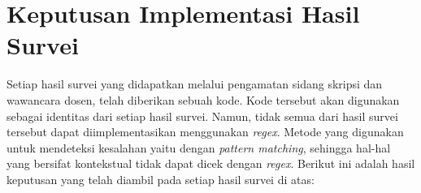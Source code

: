 \begin{comment}
			\item Konsistensi penggunaan kata \\
			Kode implementasi: VAN-02 \\
			Mahasiswa harus konsisten dalam penulisan kata, misalnya kata\textit{user} dan pengguna.  Mahasiswa harus memilih antara memakai \textit{user} atau pengguna.
			
			\item Penggunaan kata ganti orang \\
			Kode implementasi: VAN-03 \\
			Dalam penulisan dokumen skripsi, tidak boleh ada kata ganti orang. Jika karya non-ilmiah lebih santai karena memakai gaya bahasa non-formal, maka berbeda dengan karya ilmiah. Karya ilmiah memiliki aturan baku dan menggunakan bahasa formal. 
			
		\end{itemize}
		
	\item Wawancara ke-5 dilakukan pada tanggal 16 Juli 2019.
	
		\begin{itemize}
			\item Penulisan daftar referensi \\
			Kode implementasi: NAT-01 \\ 
			Penulisan daftar referensi dibuat jika dalam tulisan ilmiah tersebut memang menggunakan kutipan atau rujukan dari orang lain. Kesalahan yang sering terjadi, yaitu tidak ditemukannya referensi yang akan digunakan. Pada teks yang akan dirujuk, akan terdapat tanda [?], seharusnya tanda tanya tersebut diisi oleh nomor dari referensi.
			
		\end{itemize}
		
\end{enumerate}
\end{comment}

\section{Keputusan Implementasi Hasil Survei}

Setiap hasil survei yang didapatkan melalui pengamatan sidang skripsi dan wawancara dosen, telah diberikan sebuah kode. Kode tersebut akan digunakan sebagai identitas dari setiap hasil survei. Namun, tidak semua dari hasil survei tersebut dapat diimplementasikan menggunakan \textit{regex}. Metode yang digunakan untuk mendeteksi kesalahan yaitu dengan \textit{pattern matching}, sehingga hal-hal yang bersifat kontekstual tidak dapat dicek dengan \textit{regex}. Berikut ini adalah hasil keputusan yang telah diambil pada setiap hasil survei di atas:

